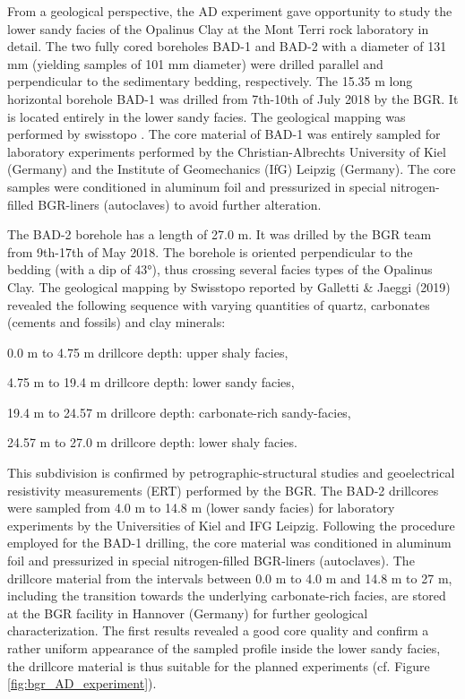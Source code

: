 From a geological perspective, the AD experiment gave opportunity to study the lower sandy facies of the Opalinus Clay at the Mont Terri rock laboratory in detail. The two fully cored boreholes BAD-1 and BAD-2 with a diameter of 131 mm (yielding samples of 101 mm diameter) were drilled parallel and perpendicular to the sedimentary bedding, respectively. The 15.35 m long horizontal borehole BAD-1 was drilled from 7th-10th of July 2018 by the BGR. It is located entirely in the lower sandy facies. The geological mapping was performed by swisstopo \cite{galletti2019}. The core material of BAD-1 was entirely sampled for laboratory experiments performed by the Christian-Albrechts University of Kiel (Germany) and the Institute of Geomechanics (IfG) Leipzig (Germany). The core samples were conditioned in aluminum foil and pressurized in special nitrogen-filled BGR-liners (autoclaves) to avoid further alteration. 

The BAD-2 borehole has a length of 27.0 m. It was drilled by the BGR team from 9th-17th of May 2018. The borehole is oriented perpendicular to the bedding (with a dip of 43°), thus crossing several facies types of the Opalinus Clay. The geological mapping by Swisstopo reported by Galletti \& Jaeggi (2019) \cite{galletti2019} revealed the following sequence with varying quantities of quartz, carbonates (cements and fossils) and clay minerals: 

\begin{list}{-}{\leftmargin=1em \itemindent=0em \itemsep=0em}
\item 0.0 m to 4.75 m drillcore depth: upper shaly facies,
\item 4.75 m to 19.4 m drillcore depth: lower sandy facies,
\item 19.4 m to 24.57 m drillcore depth: carbonate-rich sandy-facies, 
\item 24.57 m to 27.0 m drillcore depth: lower shaly facies.
\end{list}

This subdivision is confirmed by petrographic-structural studies and geoelectrical resistivity measurements (ERT) performed by the BGR. The BAD-2 drillcores were sampled from 4.0 m to 14.8 m (lower sandy facies) for laboratory experiments by the Universities of Kiel and IFG Leipzig. Following the procedure employed for the BAD-1 drilling, the core material was conditioned in aluminum foil and pressurized in special nitrogen-filled BGR-liners (autoclaves). The drillcore material from the intervals between 0.0 m to 4.0 m and 14.8 m to 27 m, including the transition towards the underlying carbonate-rich facies, are stored at the BGR facility in Hannover (Germany) for further geological characterization. The first results revealed a good core quality and confirm a rather uniform appearance of the sampled profile inside the lower sandy facies, the drillcore material is thus suitable for the planned experiments (cf. Figure \ref{fig:bgr_AD_experiment}).


